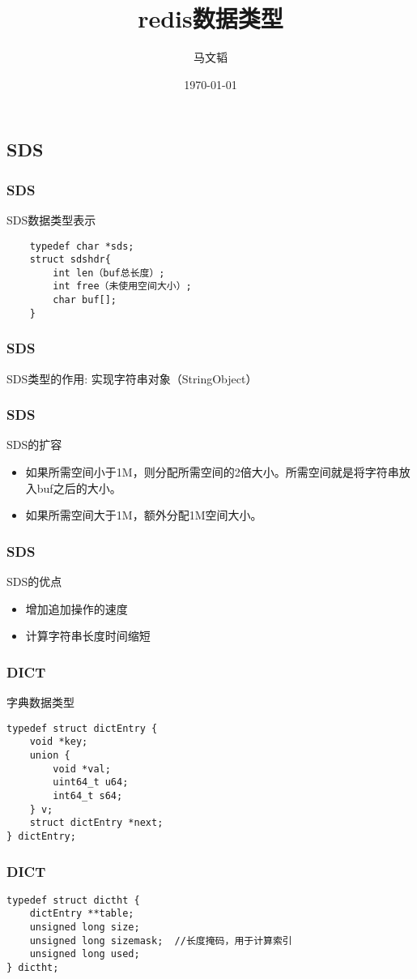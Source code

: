 \documentclass{beamer}
\begin{document}
\begin{CJK*}{UTF8}{gkai}
\title{redis数据类型} 
\author{马文韬} 
\date{\today} 

\frame{\titlepage} 



\section{SDS} 
\begin{frame}[fragile]
\frametitle{SDS}
SDS数据类型表示
\begin{verbatim}
	typedef char *sds;
	struct sdshdr{
		int len（buf总长度）;
		int free（未使用空间大小）;
		char buf[];
	}
\end{verbatim}
\end{frame}


\begin{frame}
\frametitle{SDS}
SDS类型的作用: 实现字符串对象（StringObject）
\end{frame}

\begin{frame}
\frametitle{SDS}
SDS的扩容
\begin{itemize}
\item  如果所需空间小于1M，则分配所需空间的2倍大小。所需空间就是将字符串放入buf之后的大小。
\item  如果所需空间大于1M，额外分配1M空间大小。
\end{itemize}
\end{frame}

\begin{frame}
\frametitle{SDS}
SDS的优点
\begin{itemize}
\item 增加追加操作的速度
\item 计算字符串长度时间缩短
\end{itemize}

\end{frame}


\begin{frame}[fragile]
\frametitle{DICT}
字典数据类型
\begin{verbatim}
typedef struct dictEntry {
    void *key;
    union {
        void *val;
        uint64_t u64;
        int64_t s64;
    } v;
    struct dictEntry *next;
} dictEntry;
\end{verbatim}

\end{frame}

\begin{frame}[fragile]
\frametitle{DICT}
\begin{verbatim}
typedef struct dictht {
    dictEntry **table;
    unsigned long size;
    unsigned long sizemask;  //长度掩码，用于计算索引
    unsigned long used;
} dictht;
\end{verbatim}
\end{frame}


\end{CJK*}
\end{document}
